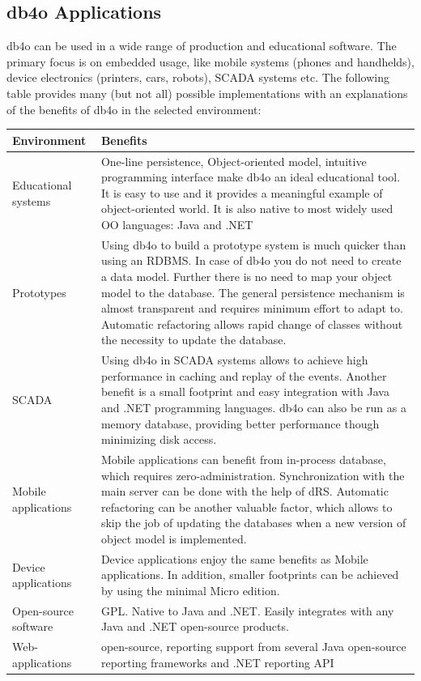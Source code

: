 \subsection{db4o Applications}
\label{ref:product-philosophy-db4o-applications}

db4o can be used in a wide range of production and educational software. The primary focus is on embedded usage, like mobile systems (phones and handhelds), device electronics (printers, cars, robots), SCADA systems etc. The following table provides many (but not all) possible implementations with an explanations of the benefits of db4o in the selected environment:

{\small
\begin{longtable}{|p{}|p{}|}
\hline
\textbf{Environment} & \textbf{Benefits} \\ \hline
Educational systems & One-line persistence, Object-oriented model, intuitive programming interface make db4o an ideal educational tool. It is easy to use and it provides a meaningful example of object-oriented world. It is also native to most widely used OO languages: Java and .NET \\ \hline
Prototypes & Using db4o to build a prototype system is much quicker than using an RDBMS. In case of db4o you do not need to create a data model. Further there is no need to map your object model to the database. The general persistence mechanism is almost transparent and requires minimum effort to adapt to. Automatic refactoring allows rapid change of classes without the necessity to update the database. \\ \hline
SCADA & Using db4o in SCADA systems allows to achieve high performance in caching and replay of the events. Another benefit is a small footprint and easy integration with Java and .NET programming languages. db4o can also be run as a memory database, providing better performance though minimizing disk access. \\ \hline
Mobile applications & Mobile applications can benefit from in-process database, which requires zero-administration. Synchronization with the main server can be done with the help of dRS. Automatic refactoring can be another valuable factor, which allows to skip the job of updating the databases when a new version of object model is implemented. \\ \hline
Device applications & Device applications enjoy the same benefits as Mobile applications. In addition, smaller footprints can be achieved by using the minimal Micro edition. \\ \hline
Open-source software & GPL. Native to Java and .NET. Easily integrates with any Java and .NET open-source products. \\ \hline
Web-applications & open-source, reporting support from several Java open-source reporting frameworks and .NET reporting API \\ \hline
\end{longtable}}

